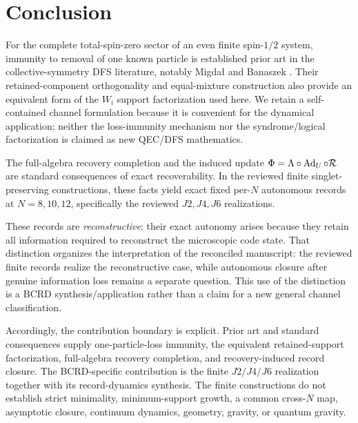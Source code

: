 \section{Conclusion}
\label{sec:conclusion}

For the complete total-spin-zero sector of an even finite spin-$1/2$ system, immunity to removal of one known particle is established prior art in the collective-symmetry DFS literature, notably Migda\l{} and Banaszek \cite{MigdalBanaszek2011}. Their retained-component orthogonality and equal-mixture construction also provide an equivalent form of the $W_i$ support factorization used here. We retain a self-contained channel formulation because it is convenient for the dynamical application; neither the loss-immunity mechanism nor the syndrome/logical factorization is claimed as new QEC/DFS mathematics.

The full-algebra recovery completion and the induced update $\Phi=\Lambda\circ\operatorname{Ad}_U\circ\mathcal R$ are standard consequences of exact recoverability. In the reviewed finite singlet-preserving constructions, these facts yield exact fixed per-$N$ autonomous records at $N=8,10,12$, specifically the reviewed $J2,J4,J6$ realizations.

These records are \emph{reconstructive}: their exact autonomy arises because they retain all information required to reconstruct the microscopic code state. That distinction organizes the interpretation of the reconciled manuscript: the reviewed finite records realize the reconstructive case, while autonomous closure after genuine information loss remains a separate question. This use of the distinction is a BCRD synthesis/application rather than a claim for a new general channel classification.

Accordingly, the contribution boundary is explicit. Prior art and standard consequences supply one-particle-loss immunity, the equivalent retained-support factorization, full-algebra recovery completion, and recovery-induced record closure. The BCRD-specific contribution is the finite $J2/J4/J6$ realization together with its record-dynamics synthesis. The finite constructions do not establish strict minimality, minimum-support growth, a common cross-$N$ map, asymptotic closure, continuum dynamics, geometry, gravity, or quantum gravity.
